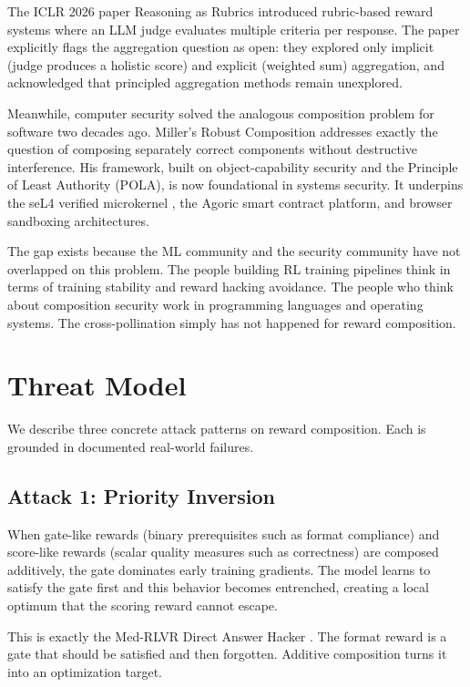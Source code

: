 \documentclass[11pt,a4paper]{article}
\begin{document}
The ICLR 2026 paper Reasoning as Rubrics \cite{rar2026} introduced rubric-based reward systems where an LLM judge evaluates multiple criteria per response. The paper explicitly flags the aggregation question as open: they explored only implicit (judge produces a holistic score) and explicit (weighted sum) aggregation, and acknowledged that principled aggregation methods remain unexplored.

Meanwhile, computer security solved the analogous composition problem for software two decades ago. Miller's Robust Composition \cite{miller2006robust} addresses exactly the question of composing separately correct components without destructive interference. His framework, built on object-capability security and the Principle of Least Authority (POLA), is now foundational in systems security. It underpins the seL4 verified microkernel \cite{klein2009sel4}, the Agoric smart contract platform, and browser sandboxing architectures.

The gap exists because the ML community and the security community have not overlapped on this problem. The people building RL training pipelines think in terms of training stability and reward hacking avoidance. The people who think about composition security work in programming languages and operating systems. The cross-pollination simply has not happened for reward composition.

\section{Threat Model}

We describe three concrete attack patterns on reward composition. Each is grounded in documented real-world failures.

\subsection{Attack 1: Priority Inversion}

When gate-like rewards (binary prerequisites such as format compliance) and score-like rewards (scalar quality measures such as correctness) are composed additively, the gate dominates early training gradients. The model learns to satisfy the gate first and this behavior becomes entrenched, creating a local optimum that the scoring reward cannot escape.

This is exactly the Med-RLVR Direct Answer Hacker \cite{zhang2025medrlvr}. The format reward is a gate that should be satisfied and then forgotten. Additive composition turns it into an optimization target.
\end{document}
